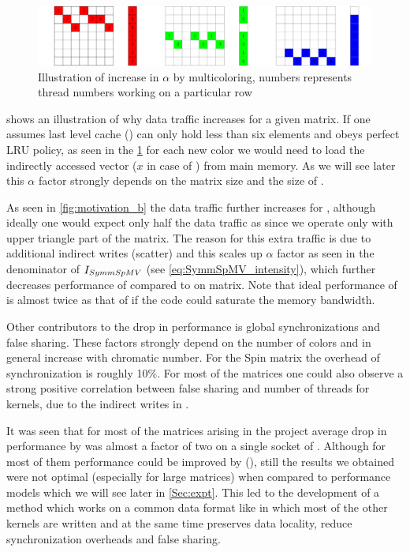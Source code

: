   \begin{figure}[htbp]
  	\centering
  	\includegraphics[scale=0.45]{pics/mc_alpha_problem/mc_alpha}
  	\caption{Illustration of increase in $\alpha$ by multicoloring, numbers represents thread numbers working on a particular row}
  	\label{fig:mc_alpha}
  \end{figure}
  
    shows an illustration of why data traffic increases for a given matrix. If one assumes last level cache (\LLC) can only hold less than six elements and obeys perfect LRU policy, as seen in the \cref{fig:mc_alpha} for  each new color we would need to load the indirectly accessed vector ($x$ in case of \SpMV) from main memory. As we will see later this $\alpha$ factor strongly depends on the matrix size and the size of \LLC.
  
 As seen in \cref{fig:motivation_b} the data traffic further increases for \SymmSpmv, although ideally one would expect only half the data traffic as \SpMV since we operate only with upper triangle part of the matrix. The reason for this extra traffic is due to additional indirect writes (scatter) and this scales up $\alpha$ factor as seen in the denominator of $I_{SymmSpMV}$ (see \cref{eq:SymmSpMV_intensity}),  which further decreases performance of \SymmSpmv compared to \SpMV on \MC matrix. Note that ideal performance of \SymmSpmv is almost twice as that of \SpMV if the code could saturate the memory bandwidth.
 
 Other contributors to the drop in performance is global synchronizations and false sharing. These factors strongly depend on the number of colors and in general increase with chromatic number. For the Spin matrix the overhead of synchronization is roughly 10\%.  For most of the matrices one could also observe a strong positive correlation between false sharing and number of threads for \SymmSpmv kernels, due to the indirect writes in \SymmSpmv.

It was seen that for most of the matrices arising in the project average drop in performance by \MCfull was almost a factor of two on a single socket of \IVB. Although for most of them performance could be improved by \ABMCfull (\ABMC), still the results we obtained were not optimal (especially for large matrices) when compared to performance models which we will see later in \cref{Sec:expt}. This led to the development of a method which works on a common data format like \CRS in which most of the other kernels are written and at the same time preserves data locality, reduce synchronization overheads and false sharing.
 

